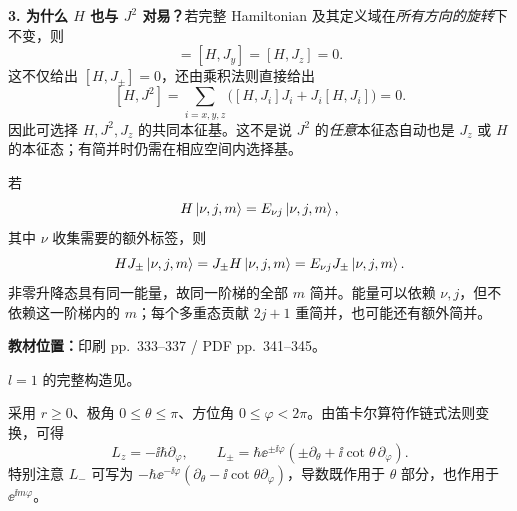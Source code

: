 \textbf{3. 为什么 $H$ 也与 $J^2$ 对易？}若完整 Hamiltonian 及其定义域在\emph{所有方向的旋转}下不变，则
\begin{equation}
  [H,J_x]=[H,J_y]=[H,J_z]=0.
\end{equation}
这不仅给出 $[H,J_\pm]=0$，还由乘积法则直接给出
\begin{equation}
  \boxed{[H,J^2]
    =\sum_{i=x,y,z}\bigl([H,J_i]J_i+J_i[H,J_i]\bigr)=0.}
\end{equation}
因此可选择 $H,J^2,J_z$ 的共同本征基。这不是说 $J^2$ 的\emph{任意}本征态自动也是 $J_z$ 或 $H$ 的本征态；有简并时仍需在相应空间内选择基。

若
\begin{equation}
  H\left|\nu,j,m\right\rangle=E_{\nu j}\left|\nu,j,m\right\rangle,
\end{equation}
其中 $\nu$ 收集需要的额外标签，则
\begin{equation}
  HJ_\pm\left|\nu,j,m\right\rangle
   =J_\pm H\left|\nu,j,m\right\rangle
   =E_{\nu j}J_\pm\left|\nu,j,m\right\rangle.
\end{equation}
非零升降态具有同一能量，故同一阶梯的全部 $m$ 简并。能量可以依赖 $\nu,j$，但不依赖这一阶梯内的 $m$；每个多重态贡献 $2j+1$ 重简并，也可能还有额外简并。


\textbf{教材位置：}印刷 pp.~333--337 / PDF pp.~341--345。

$l=1$ 的完整构造见。

采用 $r\geq0$、极角 $0\leq\theta\leq\pi$、方位角 $0\leq\varphi<2\pi$。由笛卡尔算符作链式法则变换，可得
\begin{equation}
  L_z=-\ii\hbar\partial_\varphi,\qquad
  L_\pm=\hbar\ee^{\pm\ii\varphi}
    \left(\pm\partial_\theta+\ii\cot\theta\,\partial_\varphi\right).
  \label{eq:QM-C12-S05-angular-operators}
\end{equation}
特别注意 $L_-$ 可写为 $-\hbar\ee^{-\ii\varphi}(\partial_\theta-\ii\cot\theta\partial_\varphi)$，导数既作用于 $\theta$ 部分，也作用于 $\ee^{\ii m\varphi}$。

